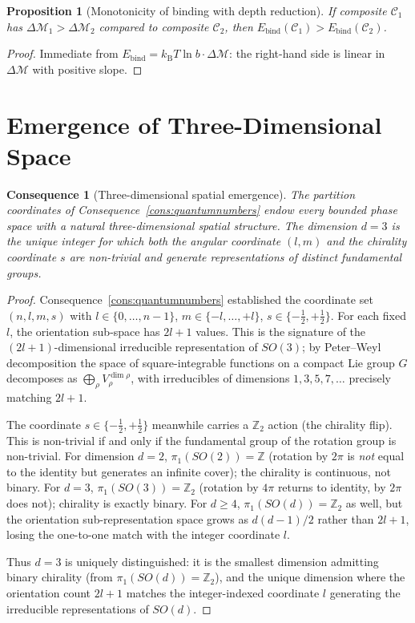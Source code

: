 \documentclass[11pt,twocolumn,a4paper]{article}
\theoremstyle{axiomstyle}
\theoremstyle{conseqstyle}
\newtheorem{consequence}{Consequence}
\newtheorem{proposition}{Proposition}
\theoremstyle{definition}
\theoremstyle{remark}
\newcommand{\kB}{k_{\mathrm{B}}}
\newcommand{\Depth}{\mathcal{M}}
\begin{document}
\begin{proposition}[Monotonicity of binding with depth reduction]
\label{prop:bindmon}
If composite $\mathcal{C}_{1}$ has $\Delta\Depth_{1}>\Delta\Depth_{2}$ compared to composite $\mathcal{C}_{2}$, then $E_{\text{bind}}(\mathcal{C}_{1})>E_{\text{bind}}(\mathcal{C}_{2})$.
\end{proposition}

\begin{proof}
Immediate from $E_{\text{bind}}=\kB T\ln b\cdot\Delta\Depth$: the right-hand side is linear in $\Delta\Depth$ with positive slope.
\end{proof}

\section{Emergence of Three-Dimensional Space}
\label{sec:spaceemergence}

\begin{consequence}[Three-dimensional spatial emergence]\label{cons:spaceemergence}
The partition coordinates of Consequence~\ref{cons:quantumnumbers} endow every bounded phase space with a natural three-dimensional spatial structure. The dimension $d=3$ is the unique integer for which both the angular coordinate $(l,m)$ and the chirality coordinate $s$ are non-trivial and generate representations of distinct fundamental groups.
\end{consequence}

\begin{proof}
Consequence~\ref{cons:quantumnumbers} established the coordinate set $(n,l,m,s)$ with $l\in\{0,\ldots,n-1\}$, $m\in\{-l,\ldots,+l\}$, $s\in\{-\tfrac12,+\tfrac12\}$. For each fixed $l$, the orientation sub-space has $2l+1$ values. This is the signature of the $(2l+1)$-dimensional irreducible representation of $SO(3)$; by Peter--Weyl decomposition the space of square-integrable functions on a compact Lie group $G$ decomposes as $\bigoplus_{\rho}V_{\rho}^{\dim\rho}$, with irreducibles of dimensions $1,3,5,7,\ldots$ precisely matching $2l+1$.

The coordinate $s\in\{-\tfrac12,+\tfrac12\}$ meanwhile carries a $\mathbb{Z}_{2}$ action (the chirality flip). This is non-trivial if and only if the fundamental group of the rotation group is non-trivial. For dimension $d=2$, $\pi_{1}(SO(2))=\mathbb{Z}$ (rotation by $2\pi$ is \emph{not} equal to the identity but generates an infinite cover); the chirality is continuous, not binary. For $d=3$, $\pi_{1}(SO(3))=\mathbb{Z}_{2}$ (rotation by $4\pi$ returns to identity, by $2\pi$ does not); chirality is exactly binary. For $d\geq 4$, $\pi_{1}(SO(d))=\mathbb{Z}_{2}$ as well, but the orientation sub-representation space grows as $d(d-1)/2$ rather than $2l+1$, losing the one-to-one match with the integer coordinate $l$.

Thus $d=3$ is uniquely distinguished: it is the smallest dimension admitting binary chirality (from $\pi_{1}(SO(d))=\mathbb{Z}_{2}$), and the unique dimension where the orientation count $2l+1$ matches the integer-indexed coordinate $l$ generating the irreducible representations of $SO(d)$.
\end{proof}
\end{document}
